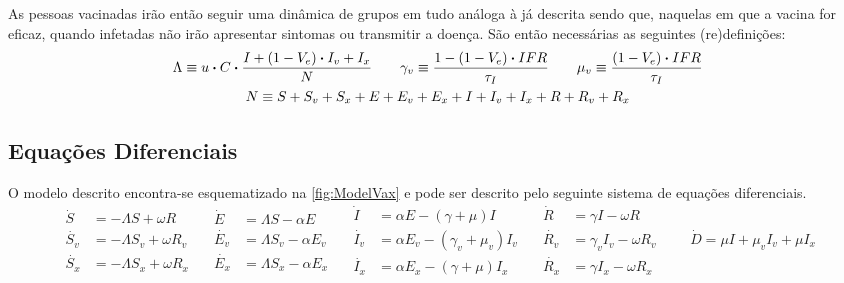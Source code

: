 As pessoas vacinadas irão então seguir uma dinâmica de grupos em tudo análoga à já descrita sendo que, naquelas em que a vacina for eficaz, quando infetadas não irão apresentar sintomas ou transmitir a doença.
São então necessárias as seguintes (re)definições:
\begin{gather*}
        \Lambda \equiv u\vdot C\vdot \frac{I + (1-V_e)\vdot I_v + I_x}{N}
        \qquad
        \gamma_v \equiv \frac{1-(1-V_e)\vdot IFR}{\tau_I}
        \qquad
        \mu_v \equiv \frac{(1-V_e)\vdot IFR}{\tau_I}
        \\
        N \equiv S + S_v + S_x + E + E_v + E_x + I + I_v + I_x + R + R_v + R_x
\end{gather*}

\subsection{Equações Diferenciais}
O modelo descrito encontra-se esquematizado na \ref{fig:ModelVax} e pode ser descrito pelo seguinte sistema de equações diferenciais.
\begin{equation*}
        \begin{aligned}
                \Dot{S}   &= - \Lambda S + \omega R
                \\
                \Dot{S_v} &= - \Lambda S_v + \omega R_v
                \\
                \Dot{S_x} &= - \Lambda S_x + \omega R_x
        \end{aligned}\quad
        \begin{aligned}
                \Dot{E}   &= \Lambda S - \alpha E
                \\
                \Dot{E_v} &= \Lambda S_v - \alpha E_v
                \\
                \Dot{E_x} &= \Lambda S_x - \alpha E_x
        \end{aligned}\quad
        \begin{aligned}
                \Dot{I}   &= \alpha E   - (\gamma   + \mu)   I
                \\
                \Dot{I_v} &= \alpha E_v - (\gamma_v + \mu_v) I_v
                \\
                \Dot{I_x} &= \alpha E_x - (\gamma   + \mu) I_x
        \end{aligned}\quad
        \begin{aligned}
                \Dot{R}   &= \gamma I     - \omega R
                \\
                \Dot{R_v} &= \gamma_v I_v - \omega R_v
                \\
                \Dot{R_x} &= \gamma I_x   - \omega R_x
        \end{aligned}\qquad
        \Dot{D} = \mu I + \mu_v I_v + \mu I_x
\end{equation*}

